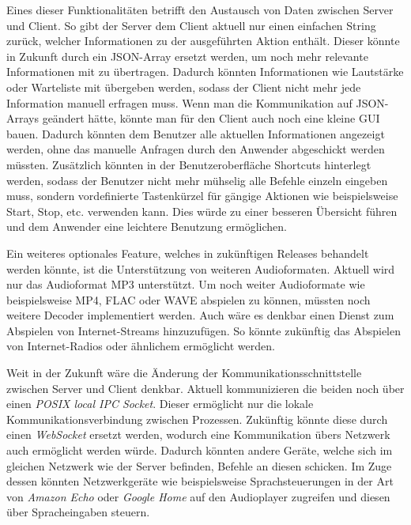 Eines dieser Funktionalitäten betrifft den Austausch von Daten zwischen 
Server und Client. So gibt der Server dem Client aktuell nur einen einfachen
String zurück, welcher Informationen zu der ausgeführten Aktion enthält. Dieser
könnte in Zukunft durch ein \ac{JSON}-Array ersetzt werden, um noch mehr
relevante Informationen mit zu übertragen. Dadurch könnten Informationen wie
Lautstärke oder Warteliste mit übergeben werden, sodass der Client nicht mehr
jede Information manuell erfragen muss. \newline
Wenn man die Kommunikation auf \ac{JSON}-Arrays geändert hätte, könnte man für
den Client auch noch eine kleine \ac{GUI} bauen. Dadurch könnten dem Benutzer alle
aktuellen Informationen angezeigt werden, ohne das manuelle Anfragen durch den
Anwender abgeschickt werden müssten. Zusätzlich könnten in der Benutzeroberfläche
Shortcuts hinterlegt werden, sodass der Benutzer nicht mehr mühselig alle
Befehle einzeln eingeben muss, sondern vordefinierte Tastenkürzel für gängige
Aktionen wie beispielsweise Start, Stop, etc. verwenden kann. Dies würde zu
einer besseren Übersicht führen und dem Anwender eine leichtere Benutzung
ermöglichen. \hfill \break

Ein weiteres optionales Feature, welches in zukünftigen Releases behandelt werden könnte,
ist die Unterstützung von weiteren Audioformaten. Aktuell wird nur das
Audioformat \ac{MP3} unterstützt. Um noch weiter Audioformate wie
beispielsweise \ac{MP4}, \ac{FLAC} oder \ac{WAVE} abspielen zu können,
müssten noch weitere Decoder implementiert werden. \newline
Auch wäre es denkbar einen Dienst zum Abspielen von Internet-Streams
hinzuzufügen. So könnte zukünftig das Abspielen von Internet-Radios oder
ähnlichem ermöglicht werden. \hfill \break

Weit in der Zukunft wäre die Änderung der Kommunikationsschnittstelle zwischen
Server und Client denkbar. Aktuell kommunizieren die beiden noch über einen
\textit{\ac{POSIX} local \ac{IPC} Socket}. Dieser ermöglicht nur die lokale
Kommunikationsverbindung zwischen Prozessen. Zukünftig könnte diese durch einen
\textit{WebSocket} ersetzt werden, wodurch eine Kommunikation übers Netzwerk
auch ermöglicht werden würde. Dadurch könnten andere Geräte, welche sich im
gleichen Netzwerk wie der Server befinden, Befehle an diesen schicken. 
Im Zuge dessen könnten Netzwerkgeräte wie beispielsweise Sprachsteuerungen in
der Art von \textit{Amazon Echo} oder \textit{Google Home} auf den
Audioplayer zugreifen und diesen über Spracheingaben steuern.

